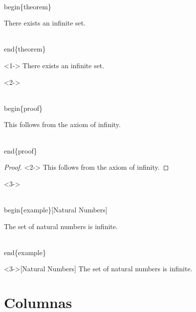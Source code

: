 \documentclass[11pt]{beamer}
\begin{document}
\begin{frame}


\begin{block}{}
\begin{semiverbatim}\scriptsize
\\begin\{theorem\}

There exists an infinite set.

\\end\{theorem\}
\end{semiverbatim}
\end{block}


\begin{theorem}<1->
There exists an infinite set.
\end{theorem}

\begin{block}<2->{}
\begin{semiverbatim}\scriptsize

\\begin\{proof\}

This follows from the axiom of infinity.

\\end\{proof\}
\end{semiverbatim}
\end{block}


\begin{proof}<2->
This follows from the axiom of infinity.
\end{proof}

\begin{block}<3->{}
\begin{semiverbatim}\scriptsize

\\begin\{example\}[Natural Numbers]

The set of natural numbers is infinite.

\\end\{example\}
\end{semiverbatim}
\end{block}


\begin{example}<3->[Natural Numbers]
The set of natural numbers is infinite.
\end{example}
\end{frame}

\section{Columnas}
\end{document}

